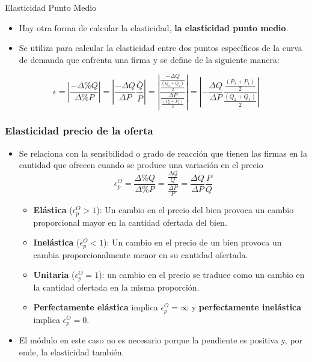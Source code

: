 \documentclass{beamer}
\begin{document}
\begin{frame}{Elasticidad Punto Medio}
  \begin{itemize}
      \item Hay otra forma de calcular la elasticidad, \textbf{la elasticidad punto medio}.
      \item Se utiliza para calcular la elasticidad entre dos puntos
      específicos de la curva de demanda que enfrenta una firma y se define
      de la siguiente manera:
    \end{itemize}
    \begin{equation*}
      \epsilon = \left|\frac{- \Delta \% Q}{\Delta \% P}\right|= \left|\frac{- \Delta Q}{\Delta P} \frac{\bar Q}{\bar P}\right| = \left|\frac{\frac{- \Delta Q}{\frac{(Q_2+Q_1)}{2}}}{\frac{\Delta P}{\frac{(P_2+P_1)}{2}}}\right| = \left|-\frac{\Delta Q}{\Delta P} \frac{\frac{(P_2+P_1)}{2}}{\frac{(Q_2+Q_1)}{2}}\right|
    \end{equation*}
\end{frame}


\begin{frame}
\frametitle{Elasticidad precio de la oferta}
  \begin{itemize}
    \item Se relaciona con la sensibilidad o grado de reacción que tienen las firmas en la cantidad que ofrecen cuando se produce una variación en el precio
    \begin{equation*}
      \epsilon^{O}_p = \frac{\Delta \% Q}{\Delta \% P} = \frac{\frac{\Delta Q}{Q}}{\frac{\Delta P}{P}} = \frac{\Delta Q}{\Delta P} \frac{P}{Q}
    \end{equation*}
    \vspace{-2mm}
    \begin{itemize}
      \item \textbf{Elástica} ($\epsilon^{O}_p>1$): Un cambio en el precio del bien provoca un cambio
      proporcional mayor en la cantidad ofertada del bien.
      \item \textbf{Inelástica} ($\epsilon^{O}_p<1$): Un cambio en el precio de un bien provoca un cambia proporcionalmente menor en su cantidad ofertada.
      \item \textbf{Unitaria} ($\epsilon^{O}_p=1$): un cambio en el precio se traduce como un cambio en la
      cantidad ofertada en la misma proporción.
      \item \textbf{Perfectamente elástica} implica $\epsilon^{O}_p=\infty$ y \textbf{perfectamente inelástica} implica $\epsilon^{O}_p=0$.
    \end{itemize}
      \item El módulo en este caso no es necesario porque la pendiente es positiva y, por ende, la elasticidad también.
   \end{itemize}
\end{frame}
\end{document}
